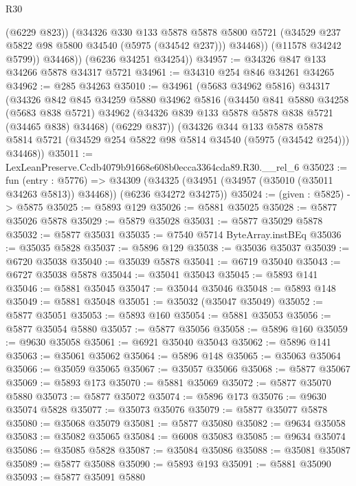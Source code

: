 \begin{lexlean}{R30}
\begin{coremodule}
                (@6229 @823))
              (@34326
                @330
                @133
                @5878
                @5878
                @5800
                @5721
                (@34529 @237 @5822 @98 @5800 @34540 (@5975 (@34542 @237)))
                @34468))
            (@11578 @34242 @5799))
          @34468))
      (@6236 @34251 @34254))
@34957 := @34326 @847 @133 @34266 @5878 @34317 @5721
@34961 := @34310 @254 @846 @34261 @34265
@34962 := @285 @34263
@35010 := @34961
    (@5683 @34962 @5816)
    @34317
    (@34326
      @842
      @845
      @34259
      @5880
      @34962
      @5816
      (@34450
        @841
        @5880
        @34258
        (@5683 @838 @5721)
        @34962
        (@34326 @839 @133 @5878 @5878 @838 @5721 (@34465 @838) @34468)
        (@6229 @837))
      (@34326
        @344
        @133
        @5878
        @5878
        @5814
        @5721
        (@34529 @254 @5822 @98 @5814 @34540 (@5975 (@34542 @254)))
        @34468))
@35011 := LexLeanPreserve.Ccdb4079b91668e608b0ecca3364cda89.R30.__rel_6
@35023 := fun (entry : @5776) =>
  @34309 (@34325 (@34951 (@34957 (@35010 (@35011 @34263 @5813)) @34468)) (@6236 @34272 @34275))
@35024 := (given : @5825) -> @5875
@35025 := @5893 @129
@35026 := @5881 @35025
@35028 := @5877 @35026 @5878
@35029 := @5879 @35028
@35031 := @5877 @35029 @5878
@35032 := @5877 @35031
@35035 := @7540 @5714 ByteArray.instBEq
@35036 := @35035 @5828
@35037 := @5896 @129
@35038 := @35036 @35037
@35039 := @6720 @35038
@35040 := @35039 @5878
@35041 := @6719 @35040
@35043 := @6727 @35038 @5878
@35044 := @35041 @35043
@35045 := @5893 @141
@35046 := @5881 @35045
@35047 := @35044 @35046
@35048 := @5893 @148
@35049 := @5881 @35048
@35051 := @35032 (@35047 @35049)
@35052 := @5877 @35051
@35053 := @5893 @160
@35054 := @5881 @35053
@35056 := @5877 @35054 @5880
@35057 := @5877 @35056
@35058 := @5896 @160
@35059 := @9630 @35058
@35061 := @6921 @35040 @35043
@35062 := @5896 @141
@35063 := @35061 @35062
@35064 := @5896 @148
@35065 := @35063 @35064
@35066 := @35059 @35065
@35067 := @35057 @35066
@35068 := @5877 @35067
@35069 := @5893 @173
@35070 := @5881 @35069
@35072 := @5877 @35070 @5880
@35073 := @5877 @35072
@35074 := @5896 @173
@35076 := @9630 @35074 @5828
@35077 := @35073 @35076
@35079 := @5877 @35077 @5878
@35080 := @35068 @35079
@35081 := @5877 @35080
@35082 := @9634 @35058
@35083 := @35082 @35065
@35084 := @6008 @35083
@35085 := @9634 @35074
@35086 := @35085 @5828
@35087 := @35084 @35086
@35088 := @35081 @35087
@35089 := @5877 @35088
@35090 := @5893 @193
@35091 := @5881 @35090
@35093 := @5877 @35091 @5880

\end{coremodule}
\end{lexlean}
